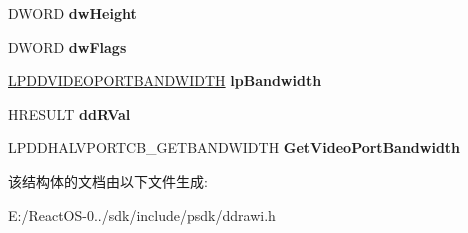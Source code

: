 \begin{DoxyCompactItemize}
D\+W\+O\+RD {\bfseries dw\+Height}
\item 
\mbox{\label{struct___d_d_h_a_l___g_e_t_v_p_o_r_t_b_a_n_d_w_i_d_t_h_d_a_t_a_aee3495553a9d96b81e55b7456ccb3955}} 
D\+W\+O\+RD {\bfseries dw\+Flags}
\item 
\mbox{\label{struct___d_d_h_a_l___g_e_t_v_p_o_r_t_b_a_n_d_w_i_d_t_h_d_a_t_a_aaec5005666fadda4382ebb156f36cd42}} 
\hyperlink{struct___d_d_v_i_d_e_o_p_o_r_t_b_a_n_d_w_i_d_t_h}{L\+P\+D\+D\+V\+I\+D\+E\+O\+P\+O\+R\+T\+B\+A\+N\+D\+W\+I\+D\+TH} {\bfseries lp\+Bandwidth}
\item 
\mbox{\label{struct___d_d_h_a_l___g_e_t_v_p_o_r_t_b_a_n_d_w_i_d_t_h_d_a_t_a_a08d44383f1acb0927f6dfe21b94b8a06}} 
H\+R\+E\+S\+U\+LT {\bfseries dd\+R\+Val}
\item 
\mbox{\label{struct___d_d_h_a_l___g_e_t_v_p_o_r_t_b_a_n_d_w_i_d_t_h_d_a_t_a_a5e62342259588eeb32e2e4acc79e7951}} 
L\+P\+D\+D\+H\+A\+L\+V\+P\+O\+R\+T\+C\+B\+\_\+\+G\+E\+T\+B\+A\+N\+D\+W\+I\+D\+TH {\bfseries Get\+Video\+Port\+Bandwidth}
\end{DoxyCompactItemize}


该结构体的文档由以下文件生成\+:\begin{DoxyCompactItemize}
\item 
E\+:/\+React\+O\+S-\/0../sdk/include/psdk/ddrawi.\+h\end{DoxyCompactItemize}
